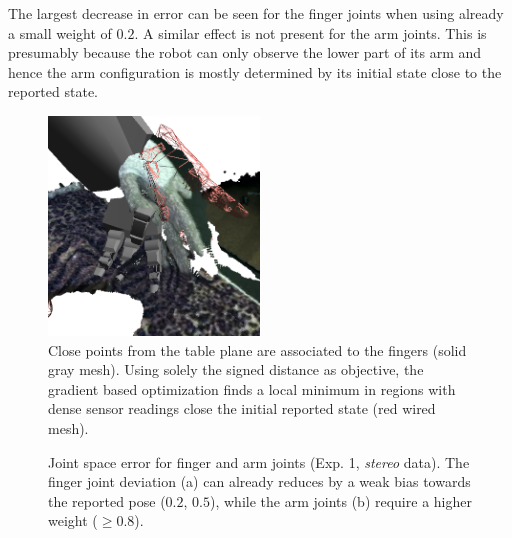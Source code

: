 The largest decrease in error can be seen for the finger joints when using already a small weight of $0.2$. A similar effect is not present for the arm joints. This is presumably because the robot can only observe the lower part of its arm and hence the arm configuration is mostly determined by its initial state close to the reported state.

\begin{figure}
\centering
\includegraphics[width=0.5\textwidth]{images/eval_prior/fingers_in_table.png}
\caption[Wrong association of data points]{Close points from the table plane are associated to the fingers (solid gray mesh). Using solely the signed distance as objective, the gradient based optimization finds a local minimum in regions with dense sensor readings close the initial reported state (red wired mesh).}
\label{fig:no_prior_fingers_table}
\end{figure}

\begin{figure}[h]
\centering
{}
%
\caption{Joint space error for finger and arm joints (Exp. 1, \textit{stereo} data). The finger joint deviation (a) can already reduces by a weak bias towards the reported pose ($0.2$, $0.5$), while the arm joints (b) require a higher weight ($\geq0.8$).}
\label{fig:stereo_joint_error}
\end{figure}

